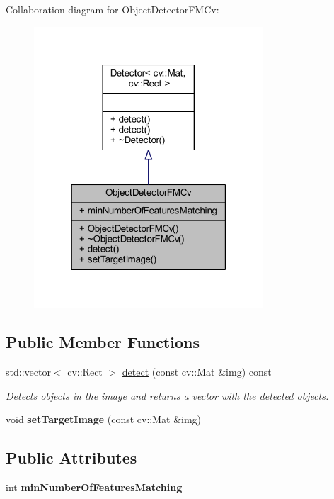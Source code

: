 Collaboration diagram for Object\+Detector\+F\+M\+Cv\+:
\nopagebreak
\begin{figure}[H]
\begin{center}
\leavevmode
\includegraphics[width=243pt]{class_viscv_1_1_object_detector_f_m_cv__coll__graph}
\end{center}
\end{figure}
\subsection*{Public Member Functions}
\begin{DoxyCompactItemize}
\item 
std\+::vector$<$ cv\+::\+Rect $>$ \hyperlink{class_viscv_1_1_object_detector_f_m_cv_a1d0c071b6e7a19b192c86ca0e47fd642}{detect} (const cv\+::\+Mat \&img) const 
\begin{DoxyCompactList}\small\item\em Detects objects in the image and returns a vector with the detected objects. \end{DoxyCompactList}\item 
\hypertarget{class_viscv_1_1_object_detector_f_m_cv_ac96a9fb73aafe02177fd8a0b57de0f3c}{}void {\bfseries set\+Target\+Image} (const cv\+::\+Mat \&img)\label{class_viscv_1_1_object_detector_f_m_cv_ac96a9fb73aafe02177fd8a0b57de0f3c}

\end{DoxyCompactItemize}
\subsection*{Public Attributes}
\begin{DoxyCompactItemize}
\item 
\hypertarget{class_viscv_1_1_object_detector_f_m_cv_a0ab0db5613e549f8bcd30c1dd3cfe31b}{}int {\bfseries min\+Number\+Of\+Features\+Matching}\label{class_viscv_1_1_object_detector_f_m_cv_a0ab0db5613e549f8bcd30c1dd3cfe31b}

\end{DoxyCompactItemize}

